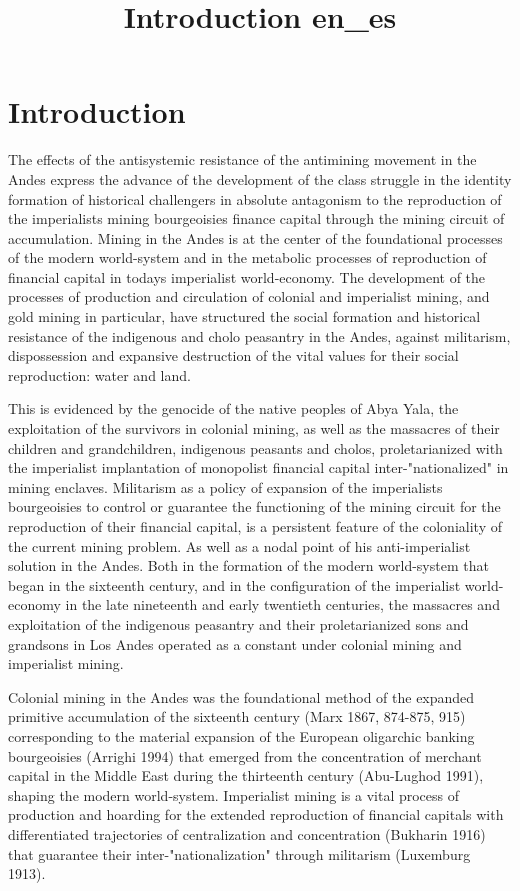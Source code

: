 \documentclass[
]{article}
\title{Introduction en\_es}
\author{}
\date{}
\begin{document}
\maketitle

\hypertarget{introduction}{%
\section{Introduction}\label{introduction}}

The effects of the antisystemic resistance of the antimining movement in
the Andes express the advance of the development of the class struggle
in the identity formation of historical challengers in absolute
antagonism to the reproduction of the imperialists mining bourgeoisies
finance capital through the mining circuit of accumulation. Mining in
the Andes is at the center of the foundational processes of the modern
world-system and in the metabolic processes of reproduction of financial
capital in today\textquotesingle s imperialist world-economy. The
development of the processes of production and circulation of colonial
and imperialist mining, and gold mining in particular, have structured
the social formation and historical resistance of the indigenous and
cholo peasantry in the Andes, against militarism, dispossession and
expansive destruction of the vital values for their social reproduction:
water and land.

This is evidenced by the genocide of the native peoples of Abya Yala,
the exploitation of the survivors in colonial mining, as well as the
massacres of their children and grandchildren, indigenous peasants and
cholos, proletarianized with the imperialist implantation of monopolist
financial capital inter-"nationalized" in mining enclaves. Militarism as
a policy of expansion of the imperialists bourgeoisies to control or
guarantee the functioning of the mining circuit for the reproduction of
their financial capital, is a persistent feature of the coloniality of
the current mining problem. As well as a nodal point of his
anti-imperialist solution in the Andes. Both in the formation of the
modern world-system that began in the sixteenth century, and in the
configuration of the imperialist world-economy in the late nineteenth
and early twentieth centuries, the massacres and exploitation of the
indigenous peasantry and their proletarianized sons and grandsons in Los
Andes operated as a constant under colonial mining and imperialist
mining.

Colonial mining in the Andes was the foundational method of the expanded
primitive accumulation of the sixteenth century (Marx 1867, 874-875,
915) corresponding to the material expansion of the European oligarchic
banking bourgeoisies (Arrighi 1994) that emerged from the concentration
of merchant capital in the Middle East during the thirteenth century
(Abu-Lughod 1991), shaping the modern world-system. Imperialist mining
is a vital process of production and hoarding for the extended
reproduction of financial capitals with differentiated trajectories of
centralization and concentration (Bukharin 1916) that guarantee their
inter-"nationalization" through militarism (Luxemburg 1913).
\end{document}
